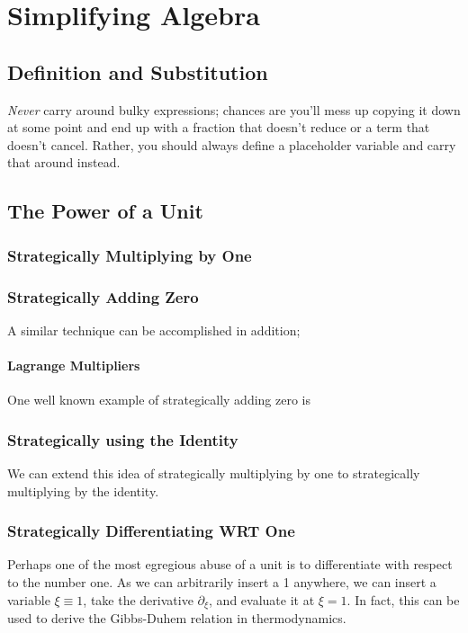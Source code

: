 \chapter{Simplifying Algebra}
\section{Definition and Substitution}
\emph{Never} carry around bulky expressions; chances are you'll mess up copying it down at some point and end up with a fraction that doesn't reduce or a term that doesn't cancel. Rather, you should always define a placeholder variable and carry that around instead.


\section{The Power of a Unit}
\subsection{Strategically Multiplying by One}
\subsection{Strategically Adding Zero}
A similar technique can be accomplished in addition;

\subsubsection{Lagrange Multipliers}
One well known example of strategically adding zero is 

\subsection{Strategically using the Identity}
We can extend this idea of strategically multiplying by one to strategically multiplying by the identity.

\subsection{Strategically Differentiating WRT One}
Perhaps one of the most egregious abuse of a unit is to differentiate with respect to the number one. As we can arbitrarily insert a 1 anywhere, we can insert a variable \(\xi \equiv 1\), take the derivative \(\partial_\xi\), and evaluate it at \(\xi = 1\). In fact, this can be used to derive the Gibbs-Duhem relation in thermodynamics.

